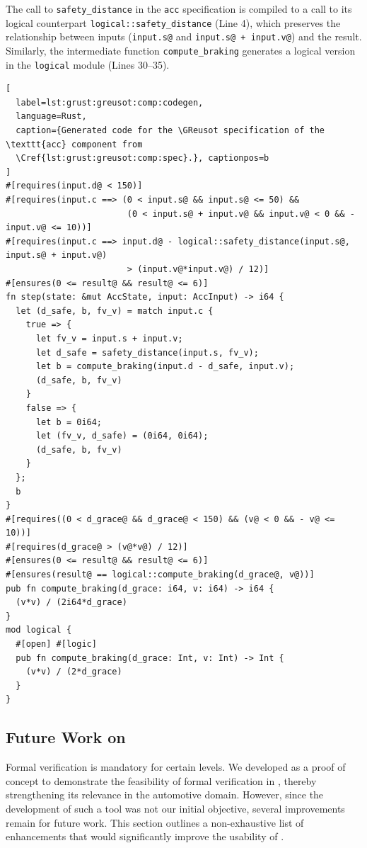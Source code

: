 The call to \verb|safety_distance| in the \verb|acc| specification is compiled to a call to its
logical counterpart \verb|logical::safety_distance| (Line 4), which preserves the relationship
between inputs (\verb|input.s@| and \verb|input.s@ + input.v@|) and the result. Similarly, the
intermediate function \verb|compute_braking| generates a logical version in the \verb|logical|
module (Lines 30--35).

\begin{lstlisting}[
  label=lst:grust:greusot:comp:codegen,
  language=Rust, 
  caption={Generated code for the \GReusot specification of the \texttt{acc} component from
  \Cref{lst:grust:greusot:comp:spec}.}, captionpos=b
]
#[requires(input.d@ < 150)]
#[requires(input.c ==> (0 < input.s@ && input.s@ <= 50) && 
                        (0 < input.s@ + input.v@ && input.v@ < 0 && - input.v@ <= 10))]
#[requires(input.c ==> input.d@ - logical::safety_distance(input.s@, input.s@ + input.v@)
                        > (input.v@*input.v@) / 12)]
#[ensures(0 <= result@ && result@ <= 6)]
fn step(state: &mut AccState, input: AccInput) -> i64 {
  let (d_safe, b, fv_v) = match input.c {
    true => {
      let fv_v = input.s + input.v;
      let d_safe = safety_distance(input.s, fv_v);
      let b = compute_braking(input.d - d_safe, input.v);
      (d_safe, b, fv_v)
    }
    false => {
      let b = 0i64;
      let (fv_v, d_safe) = (0i64, 0i64);
      (d_safe, b, fv_v)
    }
  };
  b
}
#[requires((0 < d_grace@ && d_grace@ < 150) && (v@ < 0 && - v@ <= 10))]
#[requires(d_grace@ > (v@*v@) / 12)]
#[ensures(0 <= result@ && result@ <= 6)]
#[ensures(result@ == logical::compute_braking(d_grace@, v@))]
pub fn compute_braking(d_grace: i64, v: i64) -> i64 {
  (v*v) / (2i64*d_grace)
}
mod logical {
  #[open] #[logic]
  pub fn compute_braking(d_grace: Int, v: Int) -> Int {
    (v*v) / (2*d_grace)
  }
}
\end{lstlisting}

\subsection{Future Work on \GReusot}
\label{sec:grust:greusot:future}

Formal verification is mandatory for certain \Asil levels. We developed \GReusot as a proof of
concept to demonstrate the feasibility of formal verification in \GRust, thereby strengthening its
relevance in the automotive domain. However, since the development of such a tool was not our
initial objective, several improvements remain for future work. This section outlines a
non-exhaustive list of enhancements that would significantly improve the usability of \GReusot.

